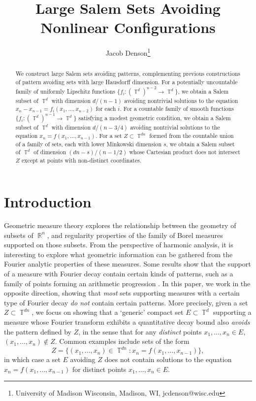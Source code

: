 \documentclass[dvipsnames,letterpaper,12pt]{article}
\title{Large Salem Sets Avoiding Nonlinear Configurations}
\author{Jacob Denson\footnote{University of Madison Wisconsin, Madison, WI, jcdenson@wisc.edu}}
\numberwithin{equation}{section}
\DeclareMathOperator{\RR}{\mathbb{R}}
\DeclareMathOperator{\TT}{\mathbb{T}}
\numberwithin{theorem}{section}
\begin{document}
\maketitle

\begin{abstract}
    We construct large Salem sets avoiding patterns, complementing previous constructions of pattern avoiding sets with large Hausdorff dimension. For a potentially uncountable family of uniformly Lipschitz functions $\{ f_i : (\TT^d)^{n-2} \to \TT^d \}$, we obtain a Salem subset of $\TT^d$ with dimension $d/(n-1)$ avoiding nontrivial solutions to the equation $x_n - x_{n-1} = f_i(x_1,\dots,x_{n-2})$ for each $i$. For a countable family of smooth functions $\{ f_i : (\TT^d)^{n-1} \to \TT^d \}$ satisfying a modest geometric condition, we obtain a Salem subset of $\TT^d$ with dimension $d/(n-3/4)$ avoiding nontrivial solutions to the equation $x_n = f(x_1,\dots,x_{n-1})$. For a set $Z \subset \TT^{dn}$ formed from the countable union of a family of sets, each with lower Minkowski dimension $s$, we obtain a Salem subset of $\TT^d$ of dimension $(dn - s)/(n - 1/2)$ whose Cartesian product does not intersect $Z$ except at points with non-distinct coordinates.
\end{abstract}

\section{Introduction}

Geometric measure theory explores the relationship between the geometry of subsets of $\RR^n$, and regularity properties of the family of Borel measures supported on those subsets. From the perspective of harmonic analysis, it is interesting to explore what geometric information can be gathered from the Fourier analytic properties of these measures. Some results show that the support of a measure with Fourier decay contain certain kinds of patterns, such as a family of points forming an arithmetic progression \cite{LabaPramanik,ChanLabaPramanik, HenriotLabaPramanik}. In this paper, we work in the opposite direction, showing that \emph{most} sets supporting measures with a certain type of Fourier decay \emph{do not} contain certain patterns. More precisely, given a set $Z \subset \TT^{dn}$, we focus on showing that a `generic' compact set $E \subset \TT^d$ supporting a measure whose Fourier transform exhibits a quantitative decay bound also \emph{avoids} the pattern defined by $Z$, in the sense that for any \emph{distinct} points $x_1,\dots,x_n \in E$, $(x_1,\dots,x_n) \not \in Z$. Common examples include sets of the form
%
\[ Z = \{ (x_1,\dots,x_n) \in \TT^{dn}: x_n = f(x_1,\dots,x_{n-1}) \}, \]
%
in which case a set $E$ avoiding $Z$ does not contain solutions to the equation $x_n = f(x_1,\dots,x_{n-1})$ for distinct points $x_1,\dots,x_n \in E$.
\end{document}
